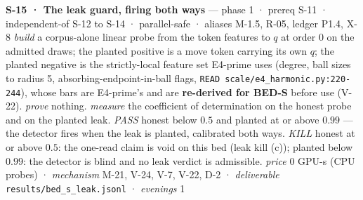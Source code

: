\documentclass[11pt,a4paper]{article}
\theoremstyle{plain}
\theoremstyle{definition}
\theoremstyle{remark}
\begin{document}
\textbf{S-15 · The leak guard, firing both ways} --- phase 1 · prereq
S-11 · independent-of S-12 to S-14 · parallel-safe · aliases M-1.5,
R-05, ledger P1.4, X-8 \emph{build} a corpus-alone linear probe from the
token features to \(q\) at order 0 on the admitted draws; the planted
positive is a move token carrying its own \(q\); the planted negative is
the strictly-local feature set E4-prime uses (degree, ball sizes to
radius 5, absorbing-endpoint-in-ball flags,
\texttt{READ\ scale/e4\_harmonic.py:220-244}), whose bars are E4-prime's
and are \textbf{re-derived for BED-S} before use (V-22). \emph{prove}
nothing. \emph{measure} the coefficient of determination on the honest
probe and on the planted leak. \emph{PASS} honest below \(0.5\) and
planted at or above \(0.99\) --- the detector fires when the leak is
planted, calibrated both ways. \emph{KILL} honest at or above \(0.5\):
the one-read claim is void on this bed (leak kill (c)); planted below
\(0.99\): the detector is blind and no leak verdict is admissible.
\emph{price} \(0\) GPU-s (CPU probes) · \emph{mechanism} M-21, V-24,
V-7, V-22, D-2 · \emph{deliverable} \texttt{results/bed\_s\_leak.jsonl}
· \emph{evenings} 1
\end{document}
